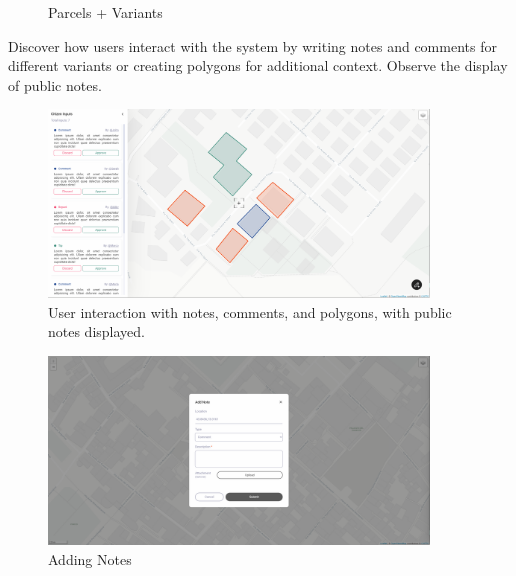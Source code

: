 \begin{figure}[H]
\begin{minipage}{0.48\textwidth}
        \caption{Parcels + Variants}
        \label{fig:web-map-all-data}
    \end{minipage}
\end{figure}


Discover how users interact with the system by writing notes and comments for different variants or creating polygons for additional context.
Observe the display of public notes.
\begin{figure}[H]
    \centering
    \includegraphics[width=0.9\textwidth]{res/web/5-notes}
    \caption{User interaction with notes, comments, and polygons, with public notes displayed.}
    \label{fig:web-notes}
\end{figure}

\begin{figure}[H]
    \centering
    \includegraphics[width=0.9\textwidth]{res/web/6-adding-notes}
    \caption{Adding Notes}
    \label{fig:web-add-note}
\end{figure}

